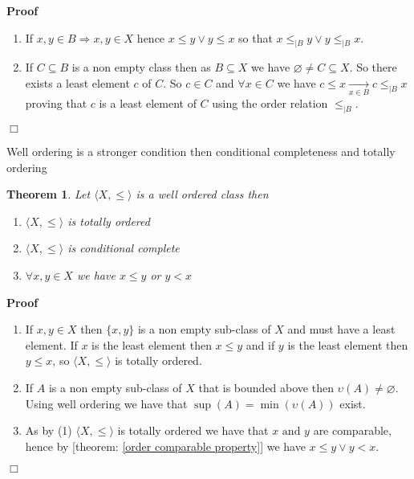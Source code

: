 \documentclass{book}
\newcommand{\Rightarrowlim}{\mathop{\rightarrow}\limits}
\newenvironment{proof}{\noindent\textbf{Proof\ }}{\hspace*{\fill}$\Box$\medskip}
\newtheorem{theorem}{Theorem}
\begin{document}
\begin{proof}
  
  \begin{enumerate}
    \item If $x, y \in B \Rightarrow x, y \in X$ hence $x \leqslant y \vee y
    \leqslant x$ so that $x \leqslant_{|B} y \vee y \leqslant_{|B} x$.
    
    \item If $C \subseteq B$ is a non empty class then as $B \subseteq X$ we
    have $\varnothing \neq C \subseteq X$. So there exists a least element $c$
    of $C$. So $c \in C$ and $\forall x \in C$ we have $c \leqslant x
    \Rightarrowlim_{x \in B} c \leqslant_{|B} x$ proving that $c$ is a least
    element of $C$ using the order relation $\leqslant_{|B}$.
  \end{enumerate}
\end{proof}

Well ordering is a stronger condition then conditional completeness and
totally ordering

\begin{theorem}
  \label{order well order implies conditional complete and totally
  ordering}Let $\langle X, \leqslant \rangle$ is a well ordered class then
  \begin{enumerate}
    \item $\langle X, \leqslant \rangle$ is totally ordered
    
    \item $\langle X, \leqslant \rangle$ is conditional complete
    
    \item $\forall x, y \in X$ we have $x \leqslant y$ or $y < x$
  \end{enumerate}
\end{theorem}

\begin{proof}
  
  \begin{enumerate}
    \item If $x, y \in X$ then $\{ x, y \}$ is a non empty sub-class of $X$
    and must have a least element. If $x$ is the least element then $x
    \leqslant y$ and if $y$ is the least element then $y \leqslant x$, so
    $\langle X, \leqslant \rangle$ is totally ordered.
    
    \item If $A$ is a non empty sub-class of $X$ that is bounded above then
    $\upsilon (A) \neq \varnothing$. Using well ordering we have that $\sup
    (A) = \min (\upsilon (A))$ exist.
    
    \item As by (1) $\langle X, \leqslant \rangle$ is totally ordered we have
    that $x \text{ and } y$ are comparable, hence by [theorem: \ref{order
    comparable property}] we have $x \leqslant y \vee y < x$.
  \end{enumerate}
\end{proof}
\end{document}
